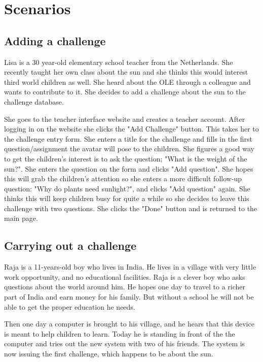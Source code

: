 \documentclass[a4paper]{article}
\begin{document}
\section{Scenarios}

\subsection{Adding a challenge}

Lisa is a 30 year-old elementary school teacher from the Netherlands. She recently taught her own class about the sun and she thinks this would interest third world children as well. She heard about the OLE through a colleague and wants to contribute to it. She decides to add a challenge about the sun to the challenge database. 

She goes to the teacher interface website and creates a teacher account. After logging in on the website she clicks the "Add Challenge" button. This takes her to the challenge entry form. She enters a title for the challenge and fills in the first question/assignment the avatar will pose to the children. She figures a good way to get the children's interest is to ask the question; "What is the weight of the sun?". She enters the question on the form and clicks "Add question". She hopes this will grab the children's attention so she enters a more difficult follow-up question: "Why do plants need sunlight?", and clicks "Add question" again. She thinks this will keep children busy for quite a while so she decides to leave this challenge with two questions. She clicks the "Done" button and is returned to the main page. 

\subsection{Carrying out a challenge}

Raja is a 11-years-old boy who lives in India. He lives in a village with very little work opportunity, and no educational facilities. Raja is a clever boy who asks questions about the world around him. He hopes one day to travel to a richer part of India and earn money for his family. But without a school he will not be able to get the proper education he needs.

Then one day a computer is brought to his village, and he hears that this device is meant to help children to learn. Today he is standing in front of the the computer and tries out the new system with two of his friends. The system is now issuing the first challenge, which happens to be about the sun.
\end{document}
